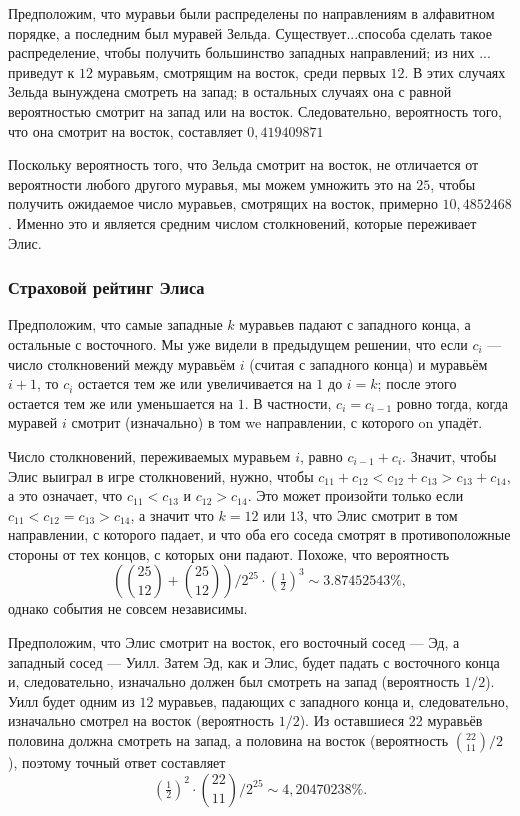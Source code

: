 Предположим, что муравьи были распределены по направлениям в алфавитном порядке, а последним был муравей Зельда.
Существует...способа сделать такое распределение, чтобы получить большинство западных направлений;
из них ... приведут к $12$ муравьям, смотрящим на восток, среди первых $12$.
В этих случаях Зельда вынуждена смотреть на запад;
в остальных случаях она с равной вероятностью смотрит на запад или на восток. Следовательно, вероятность того, что она смотрит на восток, составляет 
$0{,}419409871$

Поскольку вероятность того, что Зельда смотрит на восток, не отличается от вероятности любого другого муравья, мы можем умножить это на $25$, чтобы получить ожидаемое число муравьев, смотрящих на восток, примерно $10{,}4852468$.
Именно это и является средним числом столкновений, которые переживает Элис.

\subsubsection*{Страховой рейтинг Элиса}

Предположим, что самые западные $k$ муравьев падают с западного конца,
а остальные с восточного.
Мы уже видели в предыдущем решении, что если $c_i$ --- число столкновений между муравьём $i$ (считая с западного конца) и муравьём $i + 1$, то $c_i$ остается тем же или увеличивается на $1$ до $i = k$; после этого остается тем же или уменьшается на $1$.
В частности, $c_i=c_{i-1}$ ровно тогда, когда муравей $i$ смотрит (изначально) в том we направлении, с которого on упадёт.

Число столкновений, переживаемых муравьем $i$, равно $c_{i-1}+c_{i}$. Значит, чтобы Элис выиграл в игре столкновений, нужно, чтобы $c_{11}+c_{12}<c_{12}+c_{13}>c_{13}+c_{14}$, а это означает, что  $c_{11}<c_{13}$ и $c_{12}>c_{14}$.
Это может произойти только если $c_{11}<c_{12}=c_{13}>c_{14}$, а значит что $k = 12$ или $13$, что Элис смотрит в том направлении, с которого падает,
и что оба его соседа смотрят в противоположные стороны от тех концов, с которых они падают.
Похоже, что вероятность 
\[(\binom{25}{12}+\binom{25}{12})/2^{25}\cdot (\tfrac12)^3\sim 3.87452543\%,\]
однако события не совсем независимы.

Предположим, что Элис смотрит на восток, его восточный сосед --- Эд, а западный сосед --- Уилл.
Затем Эд, как и Элис, будет падать с восточного конца и, следовательно, изначально должен был смотреть на запад (вероятность $1/2$).
Уилл будет одним из $12$ муравьев, падающих с западного конца и, следовательно, изначально смотрел на восток (вероятность $1/2$).
Из оставшиеся 22 муравьёв половина должна смотреть на запад, а половина на восток (вероятность $\binom{22}{11}/2$), поэтому точный ответ составляет 
\[(\tfrac12)^2\cdot\binom{22}{11}/2^{25}\sim 4{,}20470238\%.\]


